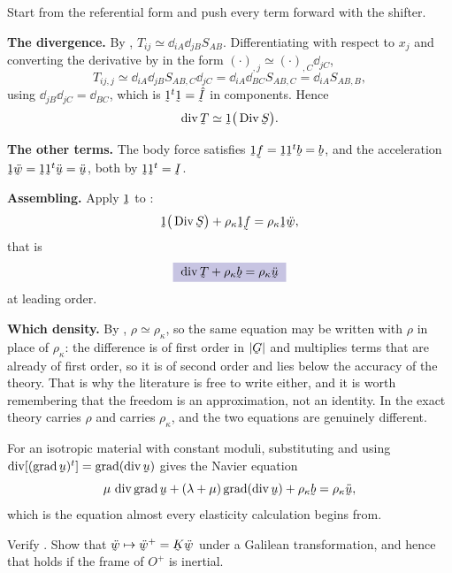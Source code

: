 \begin{solution}
Start from the referential form  and push every term forward
with the shifter.

\textbf{The divergence.} By , $T_{ij}\simeq\dd_{iA}\dd_{jB}
S_{AB}$. Differentiating with respect to $x_{j}$ and converting the
derivative by  in the form
$(\cdot)_{,j}\simeq(\cdot)_{,C}\dd_{jC}$,
\[
   T_{ij,j}\simeq\dd_{iA}\dd_{jB}S_{AB,C}\dd_{jC}
   =\dd_{iA}\dd_{BC}S_{AB,C}=\dd_{iA}S_{AB,B},
\]
using $\dd_{jB}\dd_{jC}=\dd_{BC}$, which is $\shift^{t}\shift=\hI$ in
components. Hence
\[
   \dvg\bT\simeq\shift\big(\Dvg\bS\big).
\]

\textbf{The other terms.} The body force satisfies
$\shift\bff=\shift\shift^{t}\bb=\bb$, and the acceleration
$\shift\ddot\bw=\shift\shift^{t}\ddot\bu=\ddot\bu$, both by
$\shift\shift^{t}=\I$.

\textbf{Assembling.} Apply $\shift$ to :
\[
   \shift\big(\Dvg\bS\big)+\rho_{\kappa}\shift\bff
   =\rho_{\kappa}\shift\ddot\bw ,
\]
that is
\[
   \boxed{\;\dvg\bT+\rho_{\kappa}\bb=\rho_{\kappa}\ddot\bu\;}
\]
at leading order.

\textbf{Which density.} By , $\rho\simeq\rho_{\kappa}$, so
the same equation may be written with $\rho$ in place of
$\rho_{\kappa}$: the difference is of first order in $|\bG|$ and
multiplies terms that are already of first order, so it is of second
order and lies below the accuracy of the theory. That is why the
literature is free to write either, and it is worth remembering that the
freedom is an approximation, not an identity. In the exact theory
 carries $\rho$ and  carries $\rho_{\kappa}$, and
the two equations are genuinely different.

For an isotropic material with constant moduli, substituting
 and using $\dvg[(\grad\bu)^{t}]=\grad(\dvg\bu)$ gives the
Navier equation
\[
   \mu\,\dvg\grad\bu+(\lambda+\mu)\grad(\dvg\bu)+\rho_{\kappa}\bb
   =\rho_{\kappa}\ddot\bu ,
\]
which is the equation almost every elasticity calculation begins from.
\end{solution}

\begin{problem}
Verify . Show that $\ddot\bw\mapsto\ddot\bw^{+}=\bK\ddot\bw$
under a Galilean transformation, and hence that  holds if the
frame of $O^{+}$ is inertial.
\end{problem}


